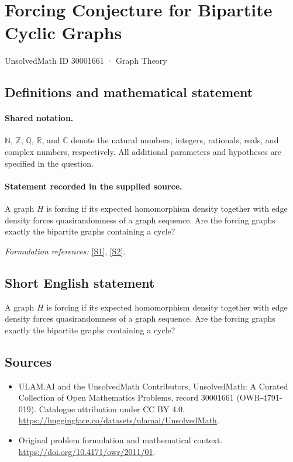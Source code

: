 \documentclass[11pt]{article}
\newcommand{\sref}[2]{\hyperlink{source:#1:#2}{[S#2]}}
\begin{document}
\setcounter{section}{30001660}
\section{Forcing Conjecture for Bipartite Cyclic Graphs}\label{30001661}
{\small UnsolvedMath ID 30001661 · Graph Theory}
\subsection{Definitions and mathematical statement}

\paragraph{Shared notation.}$\mathbb N$, $\mathbb Z$, $\mathbb Q$, $\mathbb R$, and $\mathbb C$ denote the natural numbers, integers, rationals, reals, and complex numbers, respectively. All additional parameters and hypotheses are specified in the question.


\paragraph{Statement recorded in the supplied source.}
A graph $H$ is forcing if its expected homomorphism density together with edge density forces quasirandomness of a graph sequence. Are the forcing graphs exactly the bipartite graphs containing a cycle?
\par\smallskip\textit{Formulation references:} \sref{30001661}{1}, \sref{30001661}{2}.
\subsection{Short English statement}
A graph $H$ is forcing if its expected homomorphism density together with edge density forces quasirandomness of a graph sequence. Are the forcing graphs exactly the bipartite graphs containing a cycle?
\subsection{Sources}
\begin{itemize}
\item[\hypertarget{source:30001661:1}{S1}] ULAM.AI and the UnsolvedMath Contributors, UnsolvedMath: A Curated Collection of Open Mathematics Problems, record 30001661 (OWR-4791-019). Catalogue attribution under CC BY 4.0.
\url{https://huggingface.co/datasets/ulamai/UnsolvedMath}.
\item[\hypertarget{source:30001661:2}{S2}] Original problem formulation and mathematical context.
\url{https://doi.org/10.4171/owr/2011/01}.
\end{itemize}
\label{end:30001661}
\end{document}
